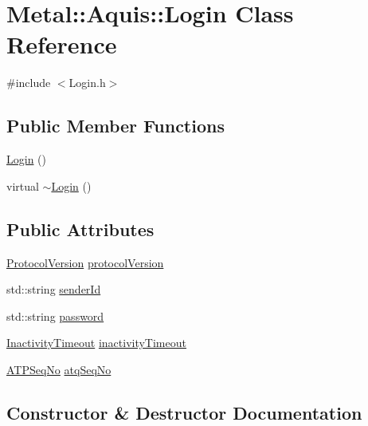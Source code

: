 \hypertarget{classMetal_1_1Aquis_1_1Login}{}\section{Metal\+:\+:Aquis\+:\+:Login Class Reference}
\label{classMetal_1_1Aquis_1_1Login}


{\ttfamily \#include $<$Login.\+h$>$}

\subsection*{Public Member Functions}
\begin{DoxyCompactItemize}
\item 
\hyperlink{classMetal_1_1Aquis_1_1Login_acdc6e7f456cc2f21b260a40f1e372872}{Login} ()
\item 
virtual \hyperlink{classMetal_1_1Aquis_1_1Login_abeac097956be4692eb4e5355a96a3fe5}{$\sim$\+Login} ()
\end{DoxyCompactItemize}
\subsection*{Public Attributes}
\begin{DoxyCompactItemize}
\item 
\hyperlink{namespaceMetal_1_1Aquis_afb46afcc05843e2d28f9e4a57bedca72}{Protocol\+Version} \hyperlink{classMetal_1_1Aquis_1_1Login_aac6c4b119ac0a8cb000ceb3a61dbae2c}{protocol\+Version}
\item 
std\+::string \hyperlink{classMetal_1_1Aquis_1_1Login_a4c8fd09c03114efa108b279f97e6337f}{sender\+Id}
\item 
std\+::string \hyperlink{classMetal_1_1Aquis_1_1Login_a3be13314d3efe4ab2f2c3ac1b5ef7837}{password}
\item 
\hyperlink{namespaceMetal_1_1Aquis_aa9b1c4c30c2f68cc03b4fe9ca2a7cd14}{Inactivity\+Timeout} \hyperlink{classMetal_1_1Aquis_1_1Login_ad6a089f1750c1e1172d2fe5f78144aaa}{inactivity\+Timeout}
\item 
\hyperlink{namespaceMetal_1_1Aquis_a1cd395dbf71a74cc9a7565053bf63a7f}{A\+T\+P\+Seq\+No} \hyperlink{classMetal_1_1Aquis_1_1Login_ae44229d9df882e56634b99e03c5b8c02}{atq\+Seq\+No}
\end{DoxyCompactItemize}


\subsection{Constructor \& Destructor Documentation}
\hypertarget{classMetal_1_1Aquis_1_1Login_acdc6e7f456cc2f21b260a40f1e372872}{}
